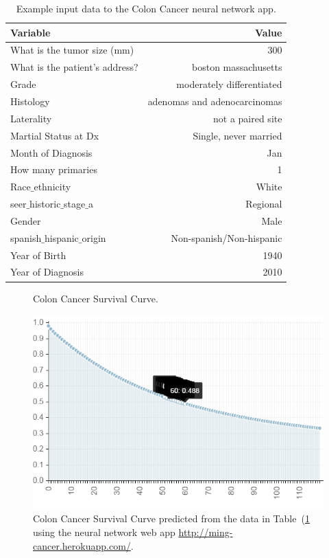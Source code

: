 \documentclass[a4paper,11pt]{article}
\begin{document}
\begin{table}[tbp]
\begin{center}
\begin{tabular}{lr}
\toprule
  Variable  & Value \\ 
\midrule
  What is the tumor size (mm) & 300 \\  
  What is the patient's address? & boston massachusetts \\ 
  Grade & moderately differentiated \\  
  Histology & adenomas and adenocarcinomas \\ 
  Laterality & not a paired site \\  
 Martial Status at Dx & Single, never married \\  
 Month of Diagnosis & Jan \\  
 How many primaries & 1 \\  
  Race$\_$ethnicity & White \\  
  seer$\_$historic$\_$stage$\_$a  & Regional \\ 
  Gender & Male \\  
  spanish$\_$hispanic$\_$origin & Non-spanish/Non-hispanic \\ 
 Year of Birth & 1940 \\  
  Year of Diagnosis & 2010 \\
\bottomrule
\end{tabular}
\caption{Example input data to the Colon Cancer neural network app.}
\label{tab:boston1940}
\end{center}
\end{table}


\begin{figure}[!ht]
 \caption{Colon Cancer Survival Curve.}
  \label{fig:boston1940}
  \centering
    \includegraphics[scale=.5]{boston1940}
\caption{\label{fig:boston1940} Colon Cancer Survival Curve predicted from the data in 
Table~(\ref{tab:boston1940} using the neural network web app \url{http://ming-cancer.herokuapp.com/}.}
\end{figure}
\end{document}
